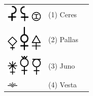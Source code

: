 \documentclass[british,final,landscape]{scrartcl}
\begin{document}
\begin{refsection}
 \tablelasttail{\bottomrule}
 \begin{supertabular}{p{0.3\textwidth}p{0.34\textwidth}p{0.34\textwidth}}
    \includegraphics[width=5mm]{Astrology/Ceres} \includegraphics[width=5mm]{Astrology/Ceres2} \includegraphics[width=5mm]{Astrology/Ceres3} & (1) Ceres         & \\
    \includegraphics[width=5mm]{Astrology/Pallas} \includegraphics[width=5mm]{Astrology/Pallas2} \includegraphics[width=5mm]{Astrology/Pallas3} & (2) Pallas        & \\
    \includegraphics[width=5mm]{Astrology/Juno} \includegraphics[width=5mm]{Astrology/Juno2} \includegraphics[width=5mm]{Astrology/Juno3} & (3) Juno          & \\
    \includegraphics[width=5mm]{Astrology/Vesta}      & (4) Vesta         & \\

\end{supertabular}
\end{refsection}
\end{document}
